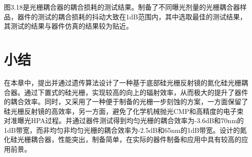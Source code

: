 图3.18是光栅耦合器的耦合损耗的测试结果。制备了不同曝光剂量的光栅耦合器样品，器件的测试的耦合损耗的抖动大致在1dB范围内，其中选取最佳的测试结果，其测试的结果与器件仿真的结果较为贴近。

\section{小结}
在本章中，提出并通过遗传算法设计了一种基于底部硅光栅反射镜的氮化硅光栅耦合器。通过下置式的硅光栅，实现较高的向上的辐射效率，从而极大的提升了器件的耦合效率。同时，又采用了一种便于制备的光栅一步刻蚀的方案，一方面保留了硅光栅反射镜的高效率，另一方面，避免了化学机械抛光CMP和高精度的电子束对准曝光HPA过程。并通过器件测试得到均匀光栅的耦合效率为-3.6dB和70nm的1dB带宽，而非均匀非均匀光栅的耦合效率为-2.5dB和65nm的1dB带宽。设计的氮化硅光栅耦合器，性能突出，制备简单，在实际的器件制备和应用中具有较高的应用前景。\cite{Xu2017High}

